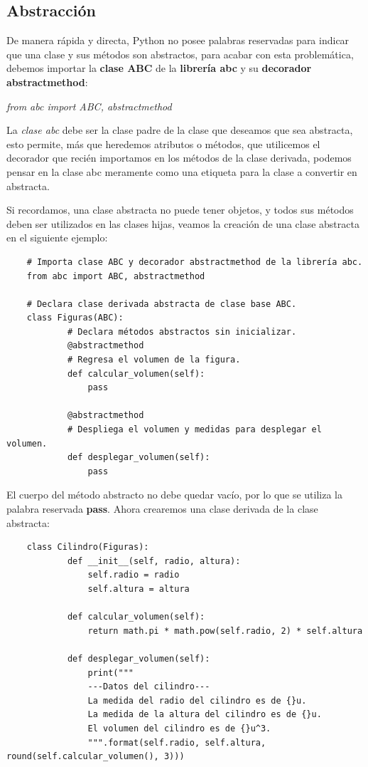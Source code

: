 \subsection{Abstracción}
\hspace{0.55cm}De manera rápida y directa, Python no posee palabras reservadas para indicar que una clase y sus métodos son abstractos, para acabar con esta problemática, debemos importar la \textbf{clase ABC} de la \textbf{librería abc} y su \textbf{decorador abstractmethod}:
\begin{center}
	\textit{from abc import ABC, abstractmethod}
\end{center}

La \textit{clase abc} debe ser la clase padre de la clase que deseamos que sea abstracta, esto permite, más que heredemos atributos o métodos, que utilicemos el decorador que recién importamos en los métodos de la clase derivada, podemos pensar en la clase abc meramente como una etiqueta para la clase a convertir en abstracta.

Si recordamos, una clase abstracta no puede tener objetos, y todos sus métodos deben ser utilizados en las clases hijas, veamos la creación de una clase abstracta en el siguiente ejemplo:
\begin{lstlisting}
	# Importa clase ABC y decorador abstractmethod de la librería abc.
	from abc import ABC, abstractmethod

	# Declara clase derivada abstracta de clase base ABC.
	class Figuras(ABC):
    		# Declara métodos abstractos sin inicializar.
    		@abstractmethod
    		# Regresa el volumen de la figura.
    		def calcular_volumen(self):
        		pass

    		@abstractmethod
    		# Despliega el volumen y medidas para desplegar el volumen.
    		def desplegar_volumen(self):
        		pass
\end{lstlisting}

El cuerpo del método abstracto no debe quedar vacío, por lo que se utiliza la palabra reservada \textbf{pass}. Ahora crearemos una clase derivada de la clase abstracta:
\begin{lstlisting}
	class Cilindro(Figuras):
    		def __init__(self, radio, altura):
        		self.radio = radio
        		self.altura = altura

    		def calcular_volumen(self):
        		return math.pi * math.pow(self.radio, 2) * self.altura

    		def desplegar_volumen(self):
        		print("""
        		---Datos del cilindro---
        		La medida del radio del cilindro es de {}u.
        		La medida de la altura del cilindro es de {}u.
        		El volumen del cilindro es de {}u^3.
        		""".format(self.radio, self.altura, round(self.calcular_volumen(), 3)))
\end{lstlisting}

